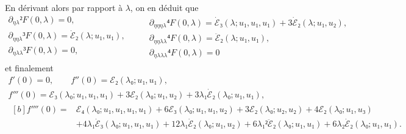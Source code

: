 \documentclass[12pt, final]{scrartcl}
\theoremstyle{definition}
\begin{document}
En dérivant alors par rapport à \(λ\), on en déduit que\\
\begin{equation*}
  \begin{gathered}
    ∂_{ηλ}² F(0, λ) = 0,\\
    ∂_{ηηλ}³ F(0, λ) = \dot{ℰ}₂(λ; u₁, u₁),\\
    ∂_{ηλλ}³ F(0, λ) = 0,\\
  \end{gathered}
  \qquad
  \begin{gathered}
    ∂_{ηηηλ}⁴ F(0, λ) = \dot{ℰ}₃(λ; u₁, u₁, u₁) + 3\dot{ℰ}₂(λ; u₁, u₂),\\
    ∂_{ηηλλ}⁴ F(0, λ) = \ddot{ℰ}₂(λ; u₁, u₁),\\
    ∂_{ηλλλ}⁴ F(0, λ) = 0
  \end{gathered}
\end{equation*}
et finalement
\begin{gather*}
    f'(0) = 0, \qquad f''(0) = ℰ₂(λ₀; u₁, u₁),\\
    f'''(0) =ℰ₃(λ₀; u₁, u₁, u₁) + 3ℰ₂(λ₀; u₁, u₂) + 3λ₁ \dot{ℰ}₂(λ₀; u₁, u₁),\\
    \begin{aligned}[b]
      f''''(0) ={}
      & ℰ₄(λ₀; u₁, u₁, u₁, u₁) + 6ℰ₃(λ₀; u₁, u₁, u₂) + 3ℰ₂(λ₀; u₂, u₂) + 4ℰ₂(λ₀; u₁, u₃)\\
      & + 4 λ₁ \dot{ℰ}₃(λ₀; u₁, u₁, u₁) + 12 λ₁ \dot{ℰ}₂(λ₀; u₁, u₂) + 6λ₁² \ddot{ℰ}₂(λ₀; u₁, u₁) + 6λ₂ \dot{ℰ}₂(λ₀; u₁, u₁).
    \end{aligned}
\end{gather*}

%
\end{document}
